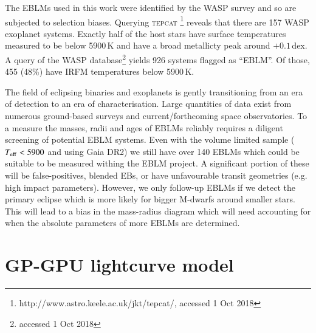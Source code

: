 The EBLMs used in this work were identified by the WASP survey and so are subjected to selection biases. Querying \textsc{tepcat} \citep{2011MNRAS.417.2166S}\footnote{http://www.astro.keele.ac.uk/jkt/tepcat/, accessed 1 Oct 2018} reveals that there are 157 WASP exoplanet systems. Exactly half of the host stars have surface temperatures measured to be below 5900\,K and have a broad metallicty peak around $+0.1$\,dex. A query of the WASP database\footnote{accessed 1 Oct 2018} yields 926 systems flagged as ``EBLM''.  Of those, 455 (48\%) have IRFM temperatures below 5900\,K.


The field of eclipsing binaries and exoplanets is gently transitioning from an era of detection to an era of characterisation. Large quantities of data exist from numerous ground-based surveys and current/forthcoming space observatories. To a measure the masses, radii and ages of EBLMs reliably requires a diligent screening of potential EBLM systems. Even with the volume limited sample ($T_{\rm eff} < 5900$ and using Gaia DR2) we still have over 140 EBLMs which could be suitable to be measured withing the EBLM project. A significant portion of these will be false-positives, blended EBs, or have unfavourable transit geometries (e.g. high impact parameters). However, we only follow-up EBLMs if we detect the primary eclipse which is more likely for bigger M-dwarfs around smaller stars. This will lead to a bias in the mass-radius diagram which will need accounting for when the absolute parameters of more EBLMs are determined. 


	
\section{GP-GPU lightcurve model}\label{discussion:qpower2}

